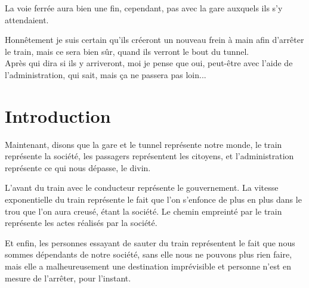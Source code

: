 \documentclass[twocolumn, french]{article}
\begin{document}
La voie ferrée aura bien une fin, cependant, pas avec la gare auxquels ils s'y attendaient.

Honnêtement je suis certain qu'ils créeront un nouveau frein à main afin d'arrêter le train, mais ce sera bien 
sûr, quand ils verront le bout du tunnel. \\
Après qui dira si ils y arriveront, moi je pense que oui, peut-être avec l'aide de l'administration, qui sait, mais 
ça ne passera pas loin...
\section*{Introduction}
Maintenant, disons que la gare et le tunnel représente notre monde, le train représente la société, les 
passagers représentent les citoyens, et l'administration représente ce qui nous dépasse, le divin.

L'avant du train avec le conducteur représente le gouvernement. La vitesse exponentielle du train représente le fait 
que l'on s'enfonce de plus en plus dans le trou que l'on aura creusé, étant la société. Le chemin empreinté par le 
train représente les actes réalisés par la société.

Et enfin, les personnes essayant de sauter du train représentent le fait que nous sommes dépendants de notre société, 
sans elle nous ne pouvons plus rien faire, mais elle a malheureusement une destination imprévisible et personne n'est 
en mesure de l'arrêter, pour l'instant.
\end{document}
